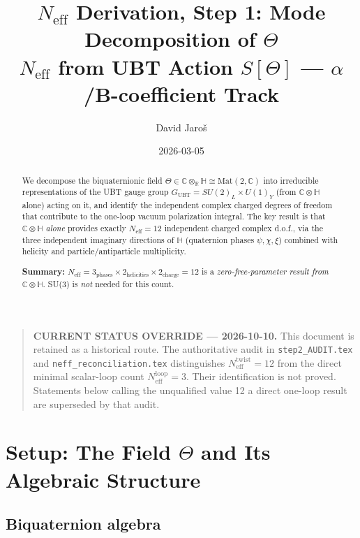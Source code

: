 \documentclass[12pt,a4paper]{article}
\title{%
  $N_\mathrm{eff}$ Derivation, Step 1: Mode Decomposition of $\Theta$\\
  \large $N_{\mathrm{eff}}$ from UBT Action $S[\Theta]$ --- $\alpha$/B-coefficient Track}
\author{David Jaroš}
\date{2026-03-05}
\theoremstyle{definition}
\theoremstyle{remark}
\newcommand{\C}{\mathbb{C}}
\newcommand{\R}{\mathbb{R}}
\renewcommand{\H}{\mathbb{H}}
\newcommand{\Neff}{N_{\mathrm{eff}}}
\begin{document}
\maketitle

\begin{quote}
\textbf{CURRENT STATUS OVERRIDE — 2026-10-10.}
This document is retained as a historical route.  The authoritative audit in
\texttt{step2\_AUDIT.tex} and \texttt{neff\_reconciliation.tex} distinguishes
\(N_{\mathrm{eff}}^{\mathrm{twist}}=12\) from the direct minimal scalar-loop
count \(N_{\mathrm{eff}}^{\mathrm{loop}}=3\).  Their identification is not
proved.  Statements below calling the unqualified value 12 a direct one-loop
result are superseded by that audit.
\end{quote}


\begin{abstract}
We decompose the biquaternionic field $\Theta \in \C \otimes_{\R} \H \cong \mathrm{Mat}(2,\C)$
into irreducible representations of the UBT gauge group
$G_{\mathrm{UBT}} = SU(2)_L \times U(1)_Y$ (from $\C \otimes \H$ alone)
acting on it, and identify the independent complex charged degrees of freedom
that contribute to the one-loop vacuum polarization integral.
The key result is that $\C \otimes \H$ \emph{alone} provides exactly
$\Neff = 12$ independent charged complex d.o.f., via the three independent
imaginary directions of $\H$ (quaternion phases $\psi, \chi, \xi$)
combined with helicity and particle/antiparticle multiplicity.

\textbf{Summary:} $\Neff = 3_{\text{phases}} \times 2_{\text{helicities}} \times 2_{\text{charge}} = 12$
is a \emph{zero-free-parameter result from $\C \otimes \H$}.
SU(3) is \emph{not} needed for this count.
\end{abstract}

\tableofcontents

\section{Setup: The Field $\Theta$ and Its Algebraic Structure}
\label{sec:setup}

\subsection{Biquaternion algebra}
\end{document}
